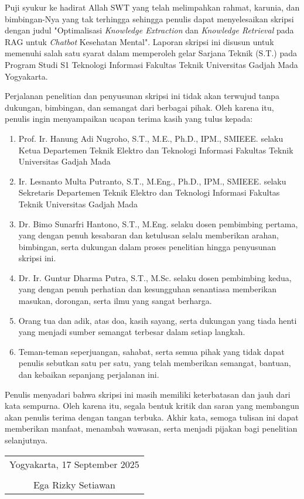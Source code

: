 Puji syukur ke hadirat Allah SWT yang telah melimpahkan rahmat, karunia, dan bimbingan-Nya yang tak terhingga sehingga penulis dapat menyelesaikan skripsi dengan judul "Optimalisasi\textit{ Knowledge Extraction} dan \textit{Knowledge Retrieval} pada RAG untuk \textit{Chatbot} Kesehatan Mental".
Laporan skripsi ini disusun untuk memenuhi salah satu syarat dalam memperoleh gelar Sarjana Teknik (S.T.) pada Program Studi S1 Teknologi Informasi Fakultas Teknik Universitas Gadjah Mada Yogyakarta.


Perjalanan penelitian dan penyusunan skripsi ini tidak akan terwujud tanpa dukungan, bimbingan, dan semangat dari berbagai pihak. Oleh karena itu, penulis ingin menyampaikan ucapan terima kasih yang tulus kepada:

\begin{enumerate}
	\item Prof. Ir. Hanung Adi Nugroho, S.T., M.E., Ph.D., IPM., SMIEEE. selaku Ketua Departemen Teknik Elektro dan Teknologi Informasi Fakultas Teknik Universitas Gadjah Mada

	\item  Ir. Lesnanto Multa Putranto, S.T., M.Eng., Ph.D., IPM., SMIEEE. selaku Sekretaris Departemen Teknik Elektro dan Teknologi Informasi Fakultas Teknik Universitas Gadjah Mada

	\item Dr. Bimo Sunarfri Hantono, S.T., M.Eng. selaku dosen pembimbing pertama, yang dengan penuh kesabaran dan ketulusan selalu memberikan arahan, bimbingan, serta dukungan dalam proses penelitian hingga penyusunan skripsi ini.

	\item Dr. Ir. Guntur Dharma Putra, S.T., M.Sc. selaku dosen pembimbing kedua, yang dengan penuh perhatian dan kesungguhan senantiasa memberikan masukan, dorongan, serta ilmu yang sangat berharga.

	\item Orang tua dan adik, atas doa, kasih sayang, serta dukungan yang tiada henti yang menjadi sumber semangat terbesar dalam setiap langkah.

	\item Teman-teman seperjuangan, sahabat, serta semua pihak yang tidak dapat penulis sebutkan satu per satu, yang telah memberikan semangat, bantuan, dan kebaikan sepanjang perjalanan ini.


\end{enumerate}

Penulis menyadari bahwa skripsi ini masih memiliki keterbatasan dan jauh dari kata sempurna. Oleh karena itu, segala bentuk kritik dan saran yang membangun akan penulis terima dengan tangan terbuka.
Akhir kata, semoga tulisan ini dapat memberikan manfaat, menambah wawasan, serta menjadi pijakan bagi penelitian selanjutnya.

\begin{flushright}
	\begin{tabular}{c}
		Yogyakarta, 17 September 2025 \\
		\vspace{1cm}                  \\
		Ega Rizky Setiawan
	\end{tabular}
\end{flushright}